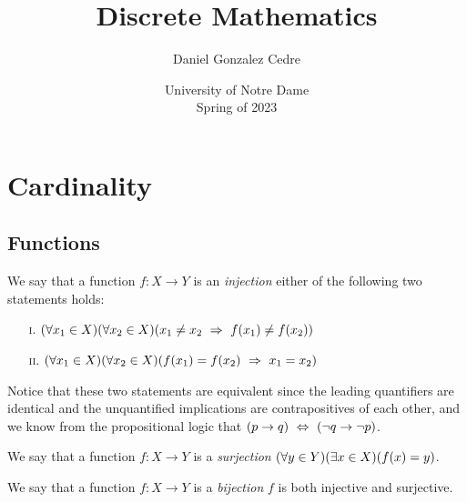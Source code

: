 





\title{Discrete Mathematics}
\author{Daniel Gonzalez Cedre}
\date{University of Notre Dame \\ Spring of 2023}
\maketitle

\setcounter{chapter}{5}
\chapter{Cardinality}

\section{Functions}

\begin{definition}[Injectivity]
    We say that a function $f: X \to Y$ is an \emph{injection}
    \iffbydefn either of the following two statements holds:
    \begin{enumerate}
        \item[\textsc{i.}]
            $\pn*{\forall x_1 \in X}\pn*{\forall x_2 \in X}\pn*{x_1 \neq x_2 \implies f(x_1) \neq f(x_2)}$
        \item[\textsc{ii.}]
            $\pn*{\forall x_1 \in X}\pn*{\forall x_2 \in X}\pn*{f(x_1) = f(x_2) \implies x_1 = x_2}$
    \end{enumerate}
    Notice that these two statements are equivalent
    since the leading quantifiers are identical
    and the unquantified implications are contrapositives of each other,
    and we know from the propositional logic that $\pn*{p \rightarrow q} \iff \pn*{\neg q \rightarrow \neg p}$.
\end{definition}

\begin{definition}[Surjectivity]
    We say that a function $f: X \to Y$ is a \emph{surjection}
    \iffbydefn $\pn*{\forall y \in Y}\pn*{\exists x \in X}\pn*{f(x) = y}$.
\end{definition}

\begin{definition}[Bijectivity]
    We say that a function $f: X \to Y$ is a \emph{bijection}
    \iffbydefn $f$ is both injective and surjective.
\end{definition}

